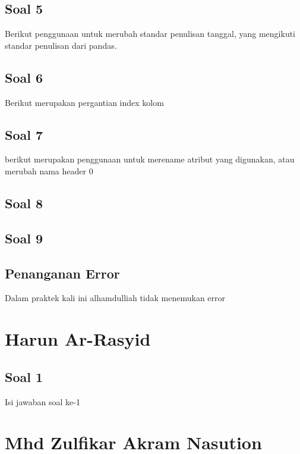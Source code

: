 \subsection{Soal 5}
Berikut penggunaan untuk merubah standar penulisan tanggal, yang mengikuti standar penulisan dari pandas.


\subsection{Soal 6}
Berikut merupakan pergantian index kolom


\subsection{Soal 7}
berikut merupakan penggunaan untuk merename atribut yang digunakan, atau merubah nama header 0


\subsection{Soal 8}


\subsection{Soal 9}


\subsection{Penanganan Error}
Dalam praktek kali ini alhamdulliah tidak menemukan error

\section{Harun Ar-Rasyid}
\subsection{Soal 1}
Isi jawaban soal ke-1

\section{Mhd Zulfikar Akram Nasution}
